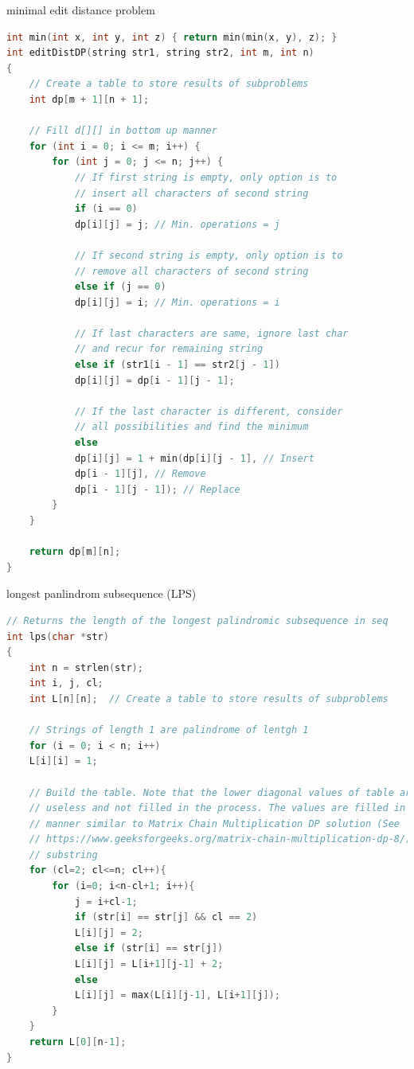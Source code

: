 \documentclass[a4paper,11pt,twoside]{book}
\begin{document}
	\par minimal edit distance problem 
\begin{lstlisting}[frame=single, language=c++]
int min(int x, int y, int z) { return min(min(x, y), z); }
int editDistDP(string str1, string str2, int m, int n)
{
	// Create a table to store results of subproblems
	int dp[m + 1][n + 1];
	
	// Fill d[][] in bottom up manner
	for (int i = 0; i <= m; i++) {
		for (int j = 0; j <= n; j++) {
			// If first string is empty, only option is to
			// insert all characters of second string
			if (i == 0)
			dp[i][j] = j; // Min. operations = j
			
			// If second string is empty, only option is to
			// remove all characters of second string
			else if (j == 0)
			dp[i][j] = i; // Min. operations = i
			
			// If last characters are same, ignore last char
			// and recur for remaining string
			else if (str1[i - 1] == str2[j - 1])
			dp[i][j] = dp[i - 1][j - 1];
			
			// If the last character is different, consider
			// all possibilities and find the minimum
			else
			dp[i][j] = 1 + min(dp[i][j - 1], // Insert
			dp[i - 1][j], // Remove
			dp[i - 1][j - 1]); // Replace
		}
	}
	
	return dp[m][n];
}		
\end{lstlisting}	
	
	\par longest panlindrom subsequence (LPS)
\begin{lstlisting}[frame=single, language=c++]
// Returns the length of the longest palindromic subsequence in seq
int lps(char *str)
{
	int n = strlen(str);
	int i, j, cl;
	int L[n][n];  // Create a table to store results of subproblems
	
	// Strings of length 1 are palindrome of lentgh 1
	for (i = 0; i < n; i++)
	L[i][i] = 1;
	
	// Build the table. Note that the lower diagonal values of table are
	// useless and not filled in the process. The values are filled in a
	// manner similar to Matrix Chain Multiplication DP solution (See
	// https://www.geeksforgeeks.org/matrix-chain-multiplication-dp-8/). cl is length of
	// substring
	for (cl=2; cl<=n; cl++){
		for (i=0; i<n-cl+1; i++){
			j = i+cl-1;
			if (str[i] == str[j] && cl == 2)
			L[i][j] = 2;
			else if (str[i] == str[j])
			L[i][j] = L[i+1][j-1] + 2;
			else
			L[i][j] = max(L[i][j-1], L[i+1][j]);
		}
	}
	return L[0][n-1];
}		
\end{lstlisting}	
	
\end{document}
